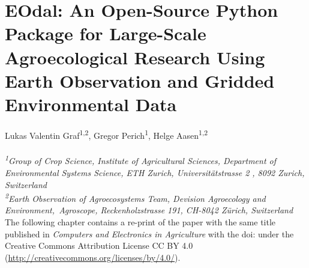 \chapter{EOdal: An Open-Source Python Package for Large-Scale Agroecological Research Using Earth Observation and Gridded Environmental Data}
\label{chap:eodal}
\graphicspath{{./02-EOdal/img}}

Lukas Valentin Graf\textsuperscript{1,2}, Gregor Perich\textsuperscript{1}, Helge Aasen\textsuperscript{1,2}
\\
\normalsize
\vspace{2pt}
\\
\textit{\textsuperscript{1}Group of Crop Science, Institute of Agricultural Sciences, Department of Environmental Systems Science, ETH Zurich, Universitätstrasse 2 , 8092 Zurich, Switzerland
\\
\textsuperscript{2}Earth Observation of Agroecosystems Team, Devision Agroecology and Environment,\ Agroscope, Reckenholzstrasse 191, CH-8042 Zürich, Switzerland
\vspace{2cm}}
\\

The following chapter contains a re-print of the paper with the same title published in \textsl{Computers and Electronics in Agriculture} with the doi:  under the Creative Commons Attribution License CC BY 4.0 (\url{http://creativecommons.org/licenses/by/4.0/}).


